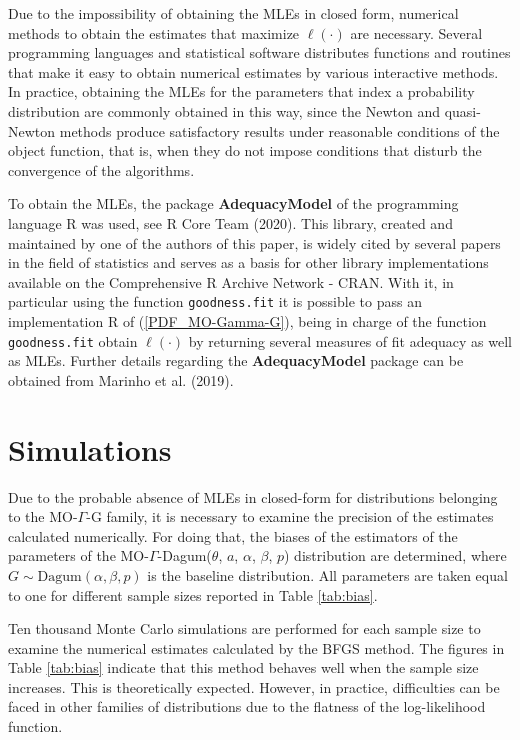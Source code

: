 \documentclass[12pt,a4paper]{article} %
\begin{document}
Due to the impossibility of obtaining the MLEs in closed form, numerical methods to obtain the estimates that maximize $ \ell (\cdot) $ are necessary. Several programming languages and statistical software distributes functions and routines that make it easy to obtain numerical estimates by various interactive methods. In practice, obtaining the MLEs for the parameters that index a probability distribution are commonly obtained in this way, since the Newton and quasi-Newton methods produce satisfactory results under reasonable conditions of the object function, that is, when they do not impose conditions that disturb the convergence of the algorithms.

To obtain the MLEs, the package {\bf AdequacyModel} of the programming language {\sf R} was used, see R Core Team (2020). This library, created and maintained by one of the authors of this paper, is widely cited by several papers in the field of statistics and serves as a basis for other library implementations available on the Comprehensive R Archive Network - CRAN. With it, in particular using the function {\tt goodness.fit} it is possible to pass an implementation {\sf R} of (\ref {PDF_MO-Gamma-G}), being in charge of the function {\tt goodness.fit} obtain $\ell (\cdot)$ by returning several measures of fit adequacy as well as MLEs. Further details regarding the {\bf AdequacyModel} package can be obtained from Marinho et al. (2019).


\section{Simulations}\label{sec:simulation}

Due to the probable absence of MLEs in closed-form for distributions belonging to the MO-$\Gamma $-G family, it is necessary to examine the
precision of the estimates calculated numerically. For doing that, the biases of the estimators of the parameters of the
MO-$\Gamma$-Dagum($\theta$, $a$, $\alpha$, $\beta$, $p$) distribution are determined, where $G\sim \mathrm {Dagum} (\alpha, \beta, p)$
is the baseline distribution. All parameters are taken equal to one for different sample sizes reported in Table \ref{tab:bias}.

Ten thousand Monte Carlo simulations are performed for each sample size to examine the numerical estimates calculated by the
BFGS method. The figures in Table \ref{tab:bias} indicate that this method behaves well when the sample size increases.
This is theoretically expected. However, in practice, difficulties can be faced in other families of distributions
due to the flatness of the log-likelihood function.
\end{document}
